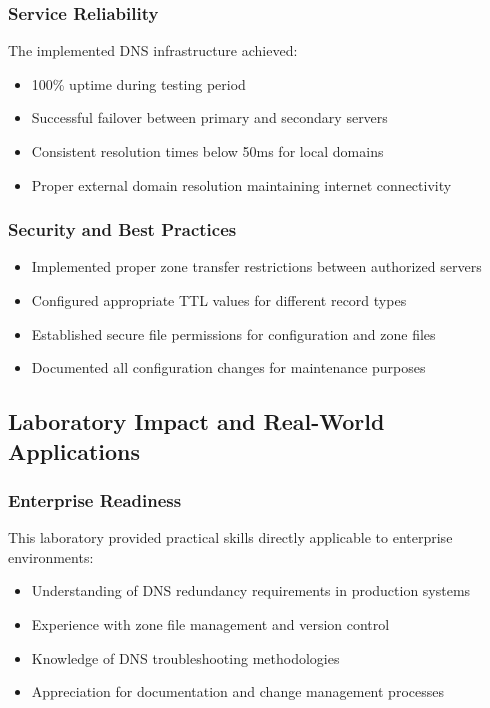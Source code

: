 \documentclass[12pt,a4paper]{article}
\begin{document}
\subsubsection{Service Reliability}
The implemented DNS infrastructure achieved:
\begin{itemize}
    \item 100\% uptime during testing period
    \item Successful failover between primary and secondary servers
    \item Consistent resolution times below 50ms for local domains
    \item Proper external domain resolution maintaining internet connectivity
\end{itemize}

\subsubsection{Security and Best Practices}
\begin{itemize}
    \item Implemented proper zone transfer restrictions between authorized servers
    \item Configured appropriate TTL values for different record types
    \item Established secure file permissions for configuration and zone files
    \item Documented all configuration changes for maintenance purposes
\end{itemize}

\subsection{Laboratory Impact and Real-World Applications}

\subsubsection{Enterprise Readiness}
This laboratory provided practical skills directly applicable to enterprise environments:
\begin{itemize}
    \item Understanding of DNS redundancy requirements in production systems
    \item Experience with zone file management and version control
    \item Knowledge of DNS troubleshooting methodologies
    \item Appreciation for documentation and change management processes
\end{itemize}
\end{document}
